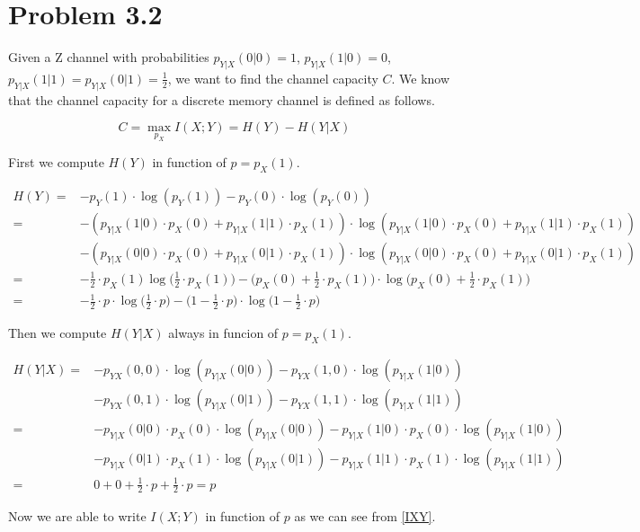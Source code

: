\section{Problem 3.2}

Given a Z channel with probabilities $p_{Y|X}(0|0)=1$, $p_{Y|X}(1|0)=0$, $p_{Y|X}(1|1)=p_{Y|X}(0|1)=\frac{1}{2}$, we want to find the channel capacity $C$. We know that the channel capacity for a discrete memory channel is defined as follows.

\begin{equation}
	C = \max_{p_X} I(X;Y) = H(Y)-H(Y|X)
\end{equation}

First we compute $H(Y)$ in function of $p=p_X(1)$.

\begin{align*}
	H(Y)= & -p_Y(1)\cdot\log(p_Y(1))-p_Y(0)\cdot\log(p_Y(0)) \\
	= & -(p_{Y|X}(1|0) \cdot p_X(0) + p_{Y|X}(1|1) \cdot p_X(1)) \cdot\log(p_{Y|X}(1|0) \cdot p_X(0) + p_{Y|X}(1|1) \cdot p_X(1)) \\ & -(p_{Y|X}(0|0) \cdot p_X(0) + p_{Y|X}(0|1) \cdot p_X(1)) \cdot\log(p_{Y|X}(0|0) \cdot p_X(0) + p_{Y|X}(0|1) \cdot p_X(1)) \\
	= & -\frac{1}{2}\cdot p_X(1)\log\Big(\frac{1}{2}\cdot p_X(1)\Big)-\Big(p_X(0)+\frac{1}{2}\cdot p_X(1)\Big)\cdot \log \Big(p_X(0)+\frac{1}{2}\cdot p_X(1)\Big) \\
	= & -\frac{1}{2}\cdot p \cdot \log\Big(\frac{1}{2}\cdot p\Big)-\Big(1-\frac{1}{2}\cdot p\Big)\cdot \log \Big(1-\frac{1}{2}\cdot p\Big)
\end{align*}

Then we compute $H(Y|X)$ always in funcion of $p=p_X(1)$.

\begin{align*}
	H(Y|X) = & -p_{YX}(0,0) \cdot \log (p_{Y|X}(0|0)) -p_{YX}(1,0) \cdot \log (p_{Y|X}(1|0)) \\
	& -p_{YX}(0,1) \cdot \log (p_{Y|X}(0|1)) -p_{YX}(1,1) \cdot \log (p_{Y|X}(1|1)) \\ =
	& -p_{Y|X}(0|0) \cdot p_X(0) \cdot \log (p_{Y|X}(0|0)) -p_{Y|X}(1|0) \cdot p_X(0) \cdot \log (p_{Y|X}(1|0)) \\
	& -p_{Y|X}(0|1) \cdot p_X(1) \cdot \log (p_{Y|X}(0|1)) -p_{Y|X}(1|1) \cdot p_X(1) \cdot \log (p_{Y|X}(1|1)) \\ =	& 0 + 0 + \frac{1}{2} \cdot p + \frac{1}{2} \cdot p = p
\end{align*}

Now we are able to write $I(X;Y)$ in function of $p$ as we can see from \eqref{IXY}.

